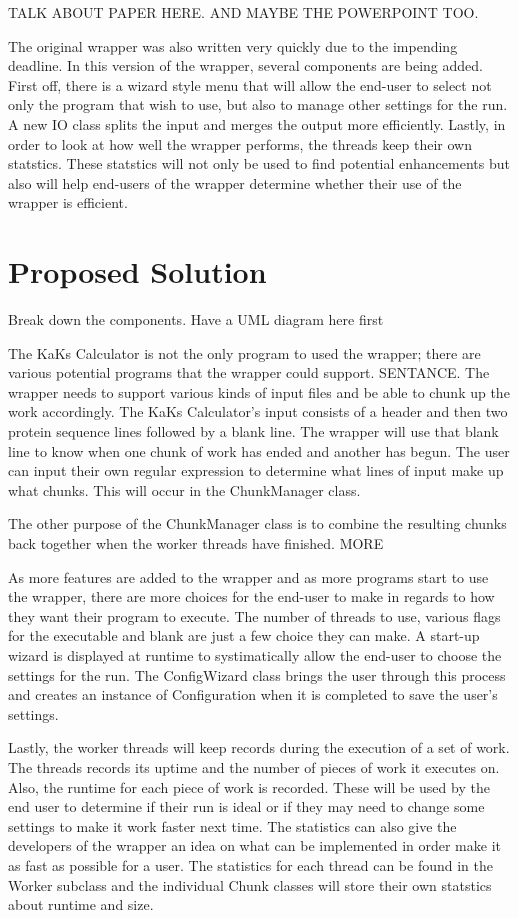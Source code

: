 \documentclass[12pt]{article}
\begin{document}
TALK ABOUT PAPER HERE. AND MAYBE THE POWERPOINT TOO.

The original wrapper was also written very quickly due to the impending
deadline. In this version of the wrapper, several components are being added.
First off, there is a wizard style menu that will allow the end-user to select
not only the program that wish to use, but also to manage other settings for the
run. A new IO class splits the input and merges the output more 
efficiently. Lastly, in order to look at how well the wrapper performs, 
the threads keep their own statstics. These statstics will not only be used to 
find potential enhancements but also will help end-users of the wrapper
determine whether their use of the wrapper is efficient.

\section{Proposed Solution}

Break down the components. Have a UML diagram here first

The KaKs Calculator is not the only program to used the wrapper; there are
various potential programs that the wrapper could support. SENTANCE. The wrapper
needs to support various kinds of input files and be able to chunk up the work
accordingly. The KaKs Calculator's input consists of a header and then two
protein sequence lines followed by a blank line. The wrapper will use that blank
line to know when one chunk of work has ended and another has begun. The user
can input their own regular expression to determine what lines of input make up
what chunks. This will occur in the ChunkManager class. 

The other purpose of the ChunkManager class is to combine the resulting chunks 
back together when the worker threads have finished. MORE

As more features are added to the wrapper and as more programs start to use the
wrapper, there are more choices for the end-user to make in regards to how they
want their program to execute. The number of threads to use, various flags for
the executable and blank are just a few choice they can make. A start-up wizard
is displayed at runtime to systimatically allow the end-user to choose the
settings for the run. The ConfigWizard class brings the user through this
process and creates an instance of Configuration when it is completed to save
the user's settings.

Lastly, the worker threads will keep records during the execution of a set of 
work. The threads records its uptime and the number of pieces of work it
executes on. Also, the runtime for each piece of work is recorded. These will be
used by the end user to determine if their run is ideal or if they may need to
change some settings to make it work faster next time. The statistics can also
give the developers of the wrapper an idea on what can be implemented in order
make it as fast as possible for a user. The statistics for each thread can be
found in the Worker subclass and the individual Chunk classes will store their
own statstics about runtime and size.
\end{document}
